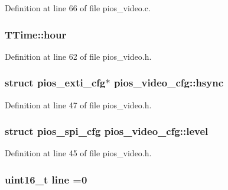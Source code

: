 Definition at line 66 of file pios\-\_\-video.\-c.

\hypertarget{group___p_i_o_s___v_i_d_e_o_gae7afd210e593b007611ac237bd32d30d}{
\subsubsection[{hour}]{ T\-Time\-::hour}}\label{group___p_i_o_s___v_i_d_e_o_gae7afd210e593b007611ac237bd32d30d}


Definition at line 62 of file pios\-\_\-video.\-h.

\hypertarget{group___p_i_o_s___v_i_d_e_o_ga01589e94ad18d5c8d12f72778539f8aa}{
\subsubsection[{hsync}]{\setlength{\rightskip}{0pt plus 5cm}struct {\bf pios\-\_\-exti\-\_\-cfg}$\ast$ pios\-\_\-video\-\_\-cfg\-::hsync}}\label{group___p_i_o_s___v_i_d_e_o_ga01589e94ad18d5c8d12f72778539f8aa}


Definition at line 47 of file pios\-\_\-video.\-h.

\hypertarget{group___p_i_o_s___v_i_d_e_o_gab3de6ddfa1d478f8062c895cad5d4793}{
\subsubsection[{level}]{\setlength{\rightskip}{0pt plus 5cm}struct {\bf pios\-\_\-spi\-\_\-cfg} pios\-\_\-video\-\_\-cfg\-::level}}\label{group___p_i_o_s___v_i_d_e_o_gab3de6ddfa1d478f8062c895cad5d4793}


Definition at line 45 of file pios\-\_\-video.\-h.

\hypertarget{group___p_i_o_s___v_i_d_e_o_ga308d53a9c395c298132110da98adb7c7}{
\subsubsection[{line}]{ {\bf uint16\-\_\-t} line =0}}\label{group___p_i_o_s___v_i_d_e_o_ga308d53a9c395c298132110da98adb7c7}


